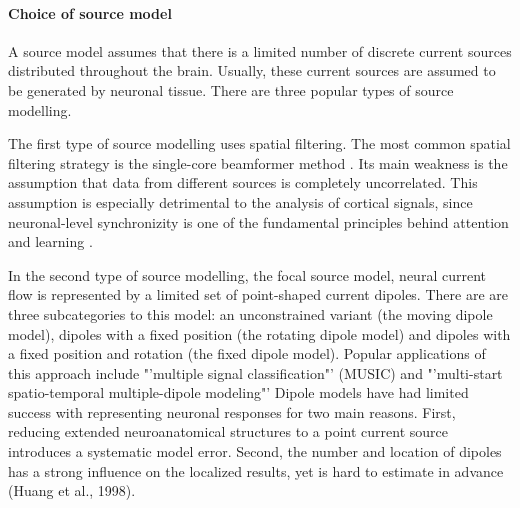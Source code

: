 \paragraph{Choice of source model}
A source model assumes that there is a limited number of discrete current sources distributed throughout the brain.
Usually, these current sources are assumed to be generated by neuronal tissue.
There are three popular types of source modelling.

The first type of source modelling uses spatial filtering.
The most common spatial filtering strategy is the single-core beamformer method \cite{1.5.Beamformer-a, 1.5.Beamformer-b}.
Its main weakness is the assumption that data from different sources is completely uncorrelated.
This assumption is especially detrimental to the analysis of cortical signals, since neuronal-level synchronizity is one of the fundamental principles behind attention and learning \cite{1.5.synchronizity}.

In the second type of source modelling, the focal source model, neural current flow is represented by a limited set of point-shaped current dipoles.
There are are three subcategories to this model: an unconstrained variant (the moving dipole model), dipoles with a fixed position (the rotating dipole model) and dipoles with a fixed position and rotation (the fixed dipole model).
Popular applications of this approach include "'multiple signal classification"' (MUSIC) \cite{1.5.music} and "'multi-start spatio-temporal multiple-dipole modeling"' \cite{1.5.simplex}
Dipole models have had limited success with representing neuronal responses for two main reasons.
First, reducing extended neuroanatomical structures to a point current source introduces a systematic model error.
Second, the number and location of dipoles has a strong influence on the localized results, yet is hard to estimate in advance (Huang et al., 1998).

